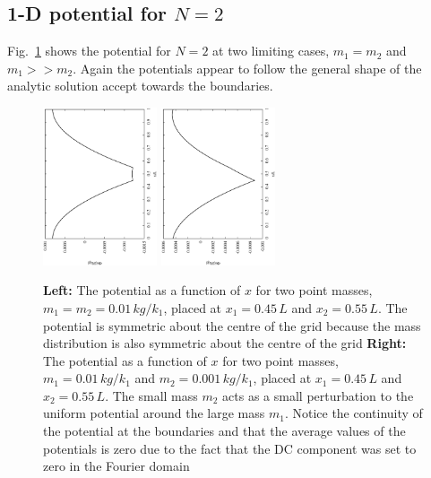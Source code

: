 \documentclass[10pt,a4paper]{article}
\begin{document}
\subsection{1-D potential for $N = 2$}
Fig.~\ref{fig:1DPotEqualMass} shows the potential for $N=2$ at two limiting cases,  $m_1 = m_2$ and $m_1>>m_2$. Again the potentials appear to follow the general shape of the analytic solution accept towards the boundaries.
\begin{figure}[h!]
\begin{center}
\includegraphics[width =0.3\textwidth, angle =-90]{equalMassPot.eps}
\includegraphics[width =0.3\textwidth, angle =-90]{diffMassPot.eps}
\caption{\textbf{Left: }The potential as a function of $x$ for two point masses, $m_1=m_2=0.01\, kg/k_1$, placed at $x_1=0.45\,L$ and $x_2 = 0.55\,L$. The potential is symmetric about the centre of the grid because the mass distribution is also symmetric about the centre of the grid \textbf{Right: }The potential as a function of $x$ for two point masses, $m_1=0.01\, kg/k_1$ and $m_2=0.001\, kg/k_1$, placed at $x_1=0.45\,L$ and $x_2 = 0.55\,L$. The small mass $m_2$ acts as a small perturbation to the uniform potential around the large mass $m_1$. Notice the continuity of the potential at the boundaries and that the average values of the potentials is zero due to the fact that the DC component was set to zero in the Fourier domain}
\label{fig:1DPotEqualMass}
\end{center}
\end{figure}
\newpage
\end{document}
